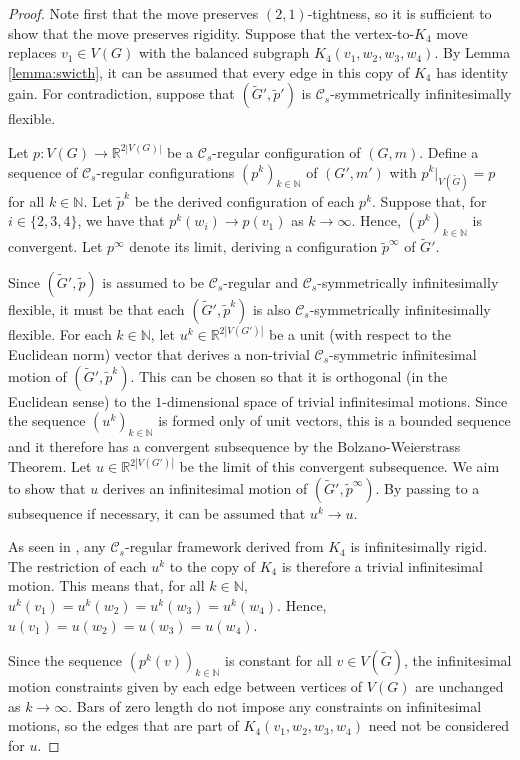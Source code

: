 \documentclass[reqno,a4paper,10pt]{article}
\theoremstyle{definition}
\theoremstyle{remark}
\numberwithin{equation}{section}
\numberwithin{figure}{section}
\numberwithin{table}{section}
\newcommand{\R}{\mathbb{R}}
\newcommand{\N}{\mathbb{N}}
\newcommand{\G}{\tilde{G}}
\newcommand{\p}{\tilde{p}}
\begin{document}
    \begin{proof}
        Note first that the move preserves $(2,1)$-tightness, so it is sufficient to show that the move preserves rigidity. Suppose that the vertex-to-$K_4$ move replaces $v_1\in V(G)$ with the balanced subgraph $K_4(v_1,w_2,w_3,w_4)$. By Lemma \ref{lemma:swicth}, it can be assumed that every edge in this copy of $K_4$ has identity gain. For contradiction, suppose that $(\G',\p')$ is $\mathcal{C}_s$-symmetrically infinitesimally flexible.
		
		Let $p:V(G)\to\R^{2|V(G)|}$ be a $\mathcal{C}_s$-regular configuration of $(G,m)$. Define a sequence of $\mathcal{C}_s$-regular configurations $(p^{k})_{k\in\N}$ of $(G',m')$ with $p^{k}|_{V(\G)}=p$ for all $k\in\N$. Let $\p^{k}$ be the derived configuration of each $p^{k}$. Suppose that, for $i\in\{2,3,4\}$, we have that $p^{k}(w_i)\to p(v_1)$ as $k\to\infty$. Hence, $(p^{k})_{k\in\N}$ is convergent. Let $p^\infty$ denote its limit, deriving a configuration $\p^\infty$ of $\G'$.
		
		Since $(\G',\p)$ is assumed to be $\mathcal{C}_s$-regular and $\mathcal{C}_s$-symmetrically infinitesimally flexible, it must be that each $(\G',\p^{k})$ is also $\mathcal{C}_s$-symmetrically infinitesimally flexible. For each $k\in\N$, let $u^k\in\R^{2|V(G')|}$ be a unit (with respect to the Euclidean norm) vector that derives a non-trivial $\mathcal{C}_s$-symmetric infinitesimal motion of $(\G',\p^{k})$. This can be chosen so that it is orthogonal (in the Euclidean sense) to the $1$-dimensional space of trivial infinitesimal motions. Since the sequence $(u^k)_{k\in\N}$ is formed only of unit vectors, this is a bounded sequence and it therefore has a convergent subsequence by the Bolzano-Weierstrass Theorem. Let $u\in\R^{2|V(G')|}$ be the limit of this convergent subsequence. We aim to show that $u$ derives an infinitesimal motion of $(\G',\p^\infty)$. By passing to a subsequence if necessary, it can be assumed that $u^k\to u$.
        
        As seen in \cite[Example 3.4]{NonEuclidean}, any $\mathcal{C}_s$-regular framework derived from $K_4$ is infinitesimally rigid. The restriction of each $u^k$ to the copy of $K_4$ is therefore a trivial infinitesimal motion. This means that, for all $k\in\N$, $u^k(v_1)=u^k(w_2)=u^k(w_3)=u^k(w_4)$. Hence, $u(v_1)=u(w_2)=u(w_3)=u(w_4)$.
		
		Since the sequence $(p^{k}(v))_{k\in\N}$ is constant for all $v\in V(\G)$, the infinitesimal motion constraints given by each edge between vertices of $V(G)$ are unchanged as $k\to\infty$. Bars of zero length do not impose any constraints on infinitesimal motions, so the edges that are part of $K_4(v_1,w_2,w_3,w_4)$ need not be considered for $u$.
        

\end{proof}
\end{document}
